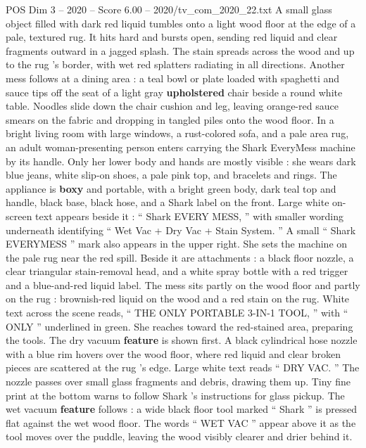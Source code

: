 \begin{textsample}{POS Dim 3 – 2020 – Score 6.00 – 2020/tv\_com\_2020\_22.txt}  \label{ex:f3_pos_074}
A small glass object filled with dark red liquid tumbles onto a light wood floor at the edge of a pale, textured rug.
It hits hard and bursts open, sending red liquid and clear fragments outward in a jagged splash.
The stain spreads across the wood and up to the rug ’s border, with wet red splatters radiating in all directions.
Another mess follows at a dining area : a teal bowl or plate loaded with spaghetti and sauce tips off the seat of a light gray \textbf{upholstered} chair beside a round white table.
Noodles slide down the chair cushion and leg, leaving orange-red sauce smears on the fabric and dropping in tangled piles onto the wood floor.
In a bright living room with large windows, a rust-colored sofa, and a pale area rug, an adult woman-presenting person enters carrying the Shark EveryMess machine by its handle.
Only her lower body and hands are mostly visible : she wears dark blue jeans, white slip-on shoes, a pale pink top, and bracelets and rings.
The appliance is \textbf{boxy} and portable, with a bright green body, dark teal top and handle, black base, black hose, and a Shark label on the front.
Large white on-screen text appears beside it : “ Shark EVERY MESS, ” with smaller wording underneath identifying “ Wet Vac + Dry Vac + Stain System. ” A small “ Shark EVERYMESS ” mark also appears in the upper right.
She sets the machine on the pale rug near the red spill.
Beside it are attachments : a black floor nozzle, a clear triangular stain-removal head, and a white spray bottle with a red trigger and a blue-and-red liquid label.
The mess sits partly on the wood floor and partly on the rug : brownish-red liquid on the wood and a red stain on the rug.
White text across the scene reads, “ THE ONLY PORTABLE 3-IN-1 TOOL, ” with “ ONLY ” underlined in green.
She reaches toward the red-stained area, preparing the tools.
The dry vacuum \textbf{feature} is shown first.
A black cylindrical hose nozzle with a blue rim hovers over the wood floor, where red liquid and clear broken pieces are scattered at the rug ’s edge.
Large white text reads “ DRY VAC. ” The nozzle passes over small glass fragments and debris, drawing them up.
Tiny fine print at the bottom warns to follow Shark ’s instructions for glass pickup.
The wet vacuum \textbf{feature} follows : a wide black floor tool marked “ Shark ” is pressed flat against the wet wood floor.
The words “ WET VAC ” appear above it as the tool moves over the puddle, leaving the wood visibly clearer and drier behind it.

\end{textsample}
